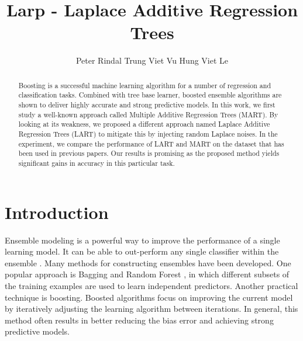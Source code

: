\documentclass{article} %
\title{Larp - Laplace Additive Regression Trees}
\author{Peter Rindal 
\And
Trung Viet Vu 
\And
Hung Viet Le}
\begin{document}
\maketitle

\begin{abstract}

Boosting is a successful machine learning algorithm for a number of regression and classification tasks. Combined with tree base learner, boosted ensemble algorithms are shown to deliver highly accurate and strong predictive models. In this work, we first study a well-known approach called Multiple Additive Regression Trees (MART). By looking at its weakness, we proposed a different approach named Laplace Additive Regression Trees (LART) to mitigate this by injecting random Laplace noises. In the experiment, we compare the performance of LART and MART on the dataset that has been used in previous papers. Our results is promising as the proposed method yields significant gains in accuracy in this particular task.

\end{abstract}

\section{Introduction}


Ensemble modeling is a powerful way to improve the performance of a single learning model.  It can be able to out-perform any single classifier within the ensemble \cite{Dietterich2000}. Many methods for constructing ensembles have been developed. One popular approach is Bagging and Random Forest \cite{Breiman2001}, in which different subsets of the training examples are used to learn independent predictors. Another practical technique is boosting. Boosted algorithms focus on improving the current model by iteratively adjusting the learning algorithm between iterations. In general, this method often results in better reducing the bias error and achieving strong predictive models. \\
\end{document}
